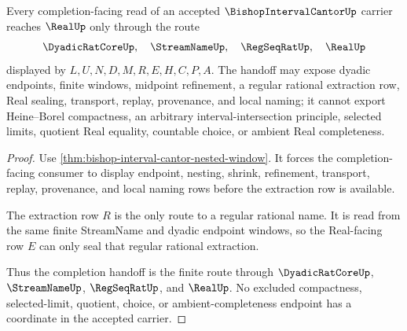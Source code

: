 \begin{theorem}
\label{thm:bishop-interval-cantor-completion-handoff}
Every completion-facing read of an accepted $\BishopIntervalCantorUp$ carrier reaches $\RealUp$ only through the route
$$
\DyadicRatCoreUp,\quad \StreamNameUp,\quad \RegSeqRatUp,\quad \RealUp
$$
displayed by $L,U,N,D,M,R,E,H,C,P,A$. The handoff may expose dyadic endpoints, finite windows, midpoint refinement, a regular rational extraction row, Real sealing, transport, replay, provenance, and local naming; it cannot export Heine--Borel compactness, an arbitrary interval-intersection principle, selected limits, quotient Real equality, countable choice, or ambient Real completeness.
\end{theorem}
\begin{proof}
Use \autoref{thm:bishop-interval-cantor-nested-window}. It forces the completion-facing consumer to display endpoint, nesting, shrink, refinement, transport, replay, provenance, and local naming rows before the extraction row is available.

The extraction row $R$ is the only route to a regular rational name. It is read from the same finite StreamName and dyadic endpoint windows, so the Real-facing row $E$ can only seal that regular rational extraction.

Thus the completion handoff is the finite route through $\DyadicRatCoreUp$, $\StreamNameUp$, $\RegSeqRatUp$, and $\RealUp$. No excluded compactness, selected-limit, quotient, choice, or ambient-completeness endpoint has a coordinate in the accepted carrier.
\end{proof}


\begin{closurestatus}{\BishopIntervalCantorUp}
  \theoryclosure{\seedClosure}
  \formalstatus{\unformalizedV}
\end{closurestatus}
